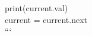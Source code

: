 \documentclass[preview]{standalone}
\begin{document}
print(current.val)\\current = current.next\\```\\
\end{document}
